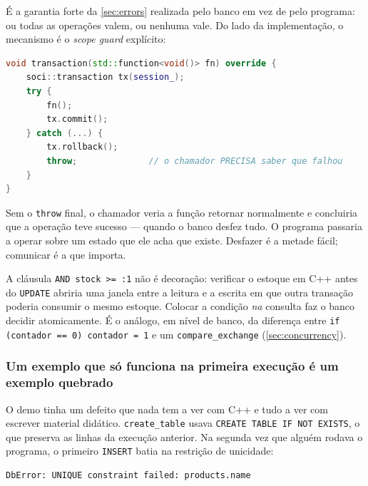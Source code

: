 É a garantia forte da \cref{sec:errors} realizada pelo banco em vez de pelo
programa: ou todas as operações valem, ou nenhuma vale. Do lado da
implementação, o mecanismo é o \emph{scope guard} explícito:

\begin{lstlisting}[style=bt, language=C++,
    caption={\texttt{src/database/db.cpp}: o \texttt{catch(...)} relança depois
             de desfazer --- desfazer não é tratar.}]
void transaction(std::function<void()> fn) override {
    soci::transaction tx(session_);
    try {
        fn();
        tx.commit();
    } catch (...) {
        tx.rollback();
        throw;              // o chamador PRECISA saber que falhou
    }
}
\end{lstlisting}

\begin{regra}
Sem o \texttt{throw} final, o chamador veria a função retornar normalmente e
concluiria que a operação teve sucesso --- quando o banco desfez tudo. O
programa passaria a operar sobre um estado que ele acha que existe. Desfazer é
a metade fácil; comunicar é a que importa.
\end{regra}

\begin{armadilha}
A cláusula \texttt{AND stock >= :1} não é decoração: verificar o estoque em C++
antes do \texttt{UPDATE} abriria uma janela entre a leitura e a escrita em que
outra transação poderia consumir o mesmo estoque. Colocar a condição \emph{na}
consulta faz o banco decidir atomicamente. É o análogo, em nível de banco, da
diferença entre \texttt{if (contador == 0) contador = 1} e um
\texttt{compare\_exchange} (\cref{sec:concurrency}).
\end{armadilha}

\subsubsection{Um exemplo que só funciona na primeira execução é um exemplo quebrado}

O demo tinha um defeito que nada tem a ver com C++ e tudo a ver com escrever
material didático. \texttt{create\_table} usava
\texttt{CREATE TABLE IF NOT EXISTS}, o que preserva as linhas da execução
anterior. Na segunda vez que alguém rodava o programa, o primeiro
\texttt{INSERT} batia na restrição de unicidade:

\begin{lstlisting}[style=bt, language=bash,
    caption={O erro na segunda execução. O demo saía com código 1 e parecia
             quebrado.}]
DbError: UNIQUE constraint failed: products.name
\end{lstlisting}

